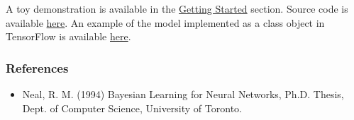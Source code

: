 A toy demonstration is available in the \href{getting-started.html}{Getting Started} section.
Source code is available
\href{https://github.com/blei-lab/edward/blob/master/examples/bayesian_nn.py}
{here}.
An example of the model implemented as a class object in TensorFlow is
available
\href{https://github.com/blei-lab/edward/blob/master/examples/tf_bayesian_nn.py}
{here}.

\subsubsection{References}\label{references}

\begin{itemize}
\item
  Neal, R. M. (1994) Bayesian Learning for Neural Networks, Ph.D.
  Thesis, Dept. of Computer Science, University of Toronto.
\end{itemize}

